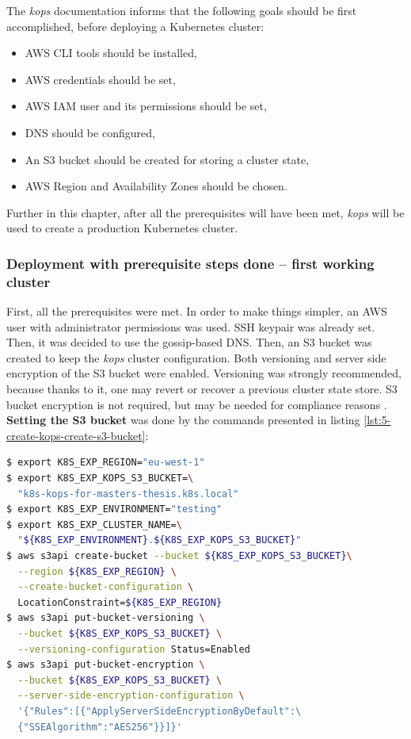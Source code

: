 The \textit{kops} documentation \cite{online-kops-aws} informs that the following goals should be first accomplished, before deploying a Kubernetes cluster:
\begin{itemize}
\item AWS CLI tools should be installed,
\item AWS credentials should be set,
\item AWS IAM user and its permissions should be set,
\item DNS should be configured,
\item An S3 bucket should be created for storing a cluster state,
\item AWS Region and Availability Zones should be chosen.
\end{itemize}

Further in this chapter, after all the prerequisites will have been met, \textit{kops} will be used to create a production Kubernetes cluster.

\subsubsection{Deployment with prerequisite steps done -- first working cluster}

First, all the prerequisites were met. In order to make things simpler, an AWS user with administrator permissions was used. SSH keypair was already set. Then, it was decided to use the gossip-based DNS. Then, an S3 bucket was created to keep the \textit{kops} cluster configuration. Both versioning and server side encryption of the S3 bucket were enabled. Versioning was strongly recommended, because thanks to it, one may revert or recover a previous cluster state store. S3 bucket encryption is not required, but may be needed for compliance reasons \cite{online-kops-aws}. \textbf{Setting the S3 bucket} was done by the commands presented in listing \ref{lst:5-create-kops-create-s3-bucket}:
\begin{lstlisting}[basicstyle=\scriptsize,xleftmargin=0cm,caption={Commands used to set an AWS S3 bucket for \textit{kops}},captionpos=b,language=Bash, label=lst:5-create-kops-create-s3-bucket]
$ export K8S_EXP_REGION="eu-west-1"
$ export K8S_EXP_KOPS_S3_BUCKET=\
  "k8s-kops-for-masters-thesis.k8s.local"
$ export K8S_EXP_ENVIRONMENT="testing"
$ export K8S_EXP_CLUSTER_NAME=\
  "${K8S_EXP_ENVIRONMENT}.${K8S_EXP_KOPS_S3_BUCKET}"
$ aws s3api create-bucket --bucket ${K8S_EXP_KOPS_S3_BUCKET}\
  --region ${K8S_EXP_REGION} \
  --create-bucket-configuration \
  LocationConstraint=${K8S_EXP_REGION}
$ aws s3api put-bucket-versioning \
  --bucket ${K8S_EXP_KOPS_S3_BUCKET} \
  --versioning-configuration Status=Enabled
$ aws s3api put-bucket-encryption \
  --bucket ${K8S_EXP_KOPS_S3_BUCKET} \
  --server-side-encryption-configuration \
  '{"Rules":[{"ApplyServerSideEncryptionByDefault":\
  {"SSEAlgorithm":"AES256"}}]}'
\end{lstlisting}


